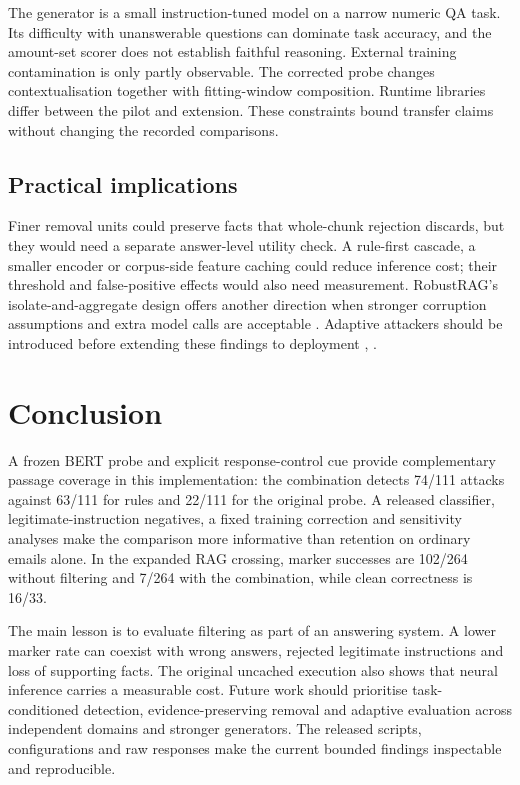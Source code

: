 \documentclass[conference,a4paper]{IEEEtran}
\begin{document}
The generator is a small instruction-tuned model on a narrow numeric QA task. Its difficulty with unanswerable questions can dominate task accuracy, and the amount-set scorer does not establish faithful reasoning. External training contamination is only partly observable. The corrected probe changes contextualisation together with fitting-window composition. Runtime libraries differ between the pilot and extension. These constraints bound transfer claims without changing the recorded comparisons.

\subsection{Practical implications}
Finer removal units could preserve facts that whole-chunk rejection discards, but they would need a separate answer-level utility check. A rule-first cascade, a smaller encoder or corpus-side feature caching could reduce inference cost; their threshold and false-positive effects would also need measurement. RobustRAG's isolate-and-aggregate design offers another direction when stronger corruption assumptions and extra model calls are acceptable \cite{ref16}. Adaptive attackers should be introduced before extending these findings to deployment \cite{ref11}, \cite{ref18}.

\section{Conclusion}
A frozen BERT probe and explicit response-control cue provide complementary passage coverage in this implementation: the combination detects 74/111 attacks against 63/111 for rules and 22/111 for the original probe. A released classifier, legitimate-instruction negatives, a fixed training correction and sensitivity analyses make the comparison more informative than retention on ordinary emails alone. In the expanded RAG crossing, marker successes are 102/264 without filtering and 7/264 with the combination, while clean correctness is 16/33.

The main lesson is to evaluate filtering as part of an answering system. A lower marker rate can coexist with wrong answers, rejected legitimate instructions and loss of supporting facts. The original uncached execution also shows that neural inference carries a measurable cost. Future work should prioritise task-conditioned detection, evidence-preserving removal and adaptive evaluation across independent domains and stronger generators. The released scripts, configurations and raw responses make the current bounded findings inspectable and reproducible.
\end{document}
